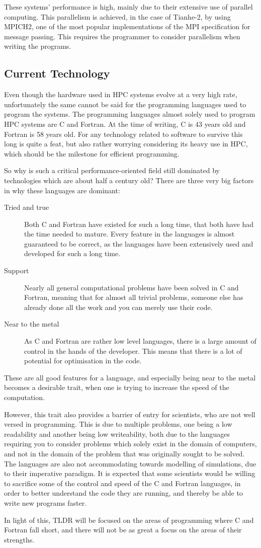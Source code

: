 These systems' performance is high, mainly due to their extensive use of parallel computing. This parallelism is achieved, in the case of Tianhe-2, by using MPICH2, one of the most popular implementations of the MPI specification for message passing. This requires the programmer to consider parallelism when writing the programs.

\subsection{Current Technology}

Even though the hardware used in HPC systems evolve at a very high rate, unfortunately the same cannot be said for the programming languages used to program the systems. The programming languages almost solely used to program HPC systems are C and Fortran. At the time of writing, C is 43 years old and Fortran is 58 years old. For any technology related to software to survive this long is quite a feat, but also rather worrying considering its heavy use in HPC, which should be the milestone for efficient programming.

So why is such a critical performance-oriented field still dominated by technologies which are about half a century old? There are three very big factors in why these languages are dominant:

\begin{description}
	\item [Tried and true]
	Both C and Fortran have existed for such a long time, that both have had the time needed to mature. Every feature in the languages is almost guaranteed to be correct, as the languages have been extensively used and developed for such a long time.
	\item [Support]
	Nearly all general computational problems have been solved in C and Fortran, meaning that for almost all trivial problems, someone else has already done all the work and you can merely use their code.
	\item [Near to the metal]
	As C and Fortran are rather low level languages, there is a large amount of control in the hands of the developer. This means that there is a lot of potential for optimisation in the code.
\end{description}

These are all good features for a language, and especially being near to the metal becomes a desirable trait, when one is trying to increase the speed of the computation. 

However, this trait also provides a barrier of entry for scientists, who are not well versed in programming. This is due to multiple problems, one being a low readability and another being low writeability, both due to the languages requiring you to consider problems which solely exist in the domain of computers, and not in the domain of the problem that was originally sought to be solved. The languages are also not accommodating towards modelling of simulations, due to their imperative paradigm. It is expected that some scientists would be willing to sacrifice some of the control and speed of the C and Fortran languages, in order to better understand the code they are running, and thereby be able to write new programs faster.

In light of this, TLDR will be focused on the areas of programming where C and Fortran fall short, and there will not be as great a focus on the areas of their strengths.
